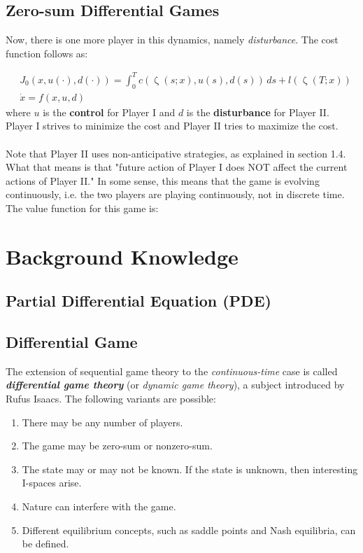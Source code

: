\documentclass{article}
\begin{document}
\subsection{Zero-sum Differential Games}
Now, there is one more player in this dynamics, namely \textit{disturbance}. The cost function follows as:

\begin{equation}
    \begin{aligned}
        & J_0(x,u(\cdot), d(\cdot)) =  \int_{0}^{T} c(\upzeta (s;x), u(s), d(s)) \, ds + l(\upzeta(T; x)) \\
        & \dot{x} = f(x,u,d)
    \end{aligned}
\end{equation}
where $u$ is the \textbf{control} for Player I and $d$ is the \textbf{disturbance} for Player II. Player I strives to minimize the cost and Player II tries to maximize the cost. 
\\
\\
\quad Note that Player II uses non-anticipative strategies, as explained in section 1.4. What that means is that "future action of Player I does NOT affect the current actions of Player II." In some sense, this means that the game is evolving continuously, i.e. the two players are playing continuously, not in discrete time. 
\\
The value function for this game is:


\newpage

\section{Background Knowledge}

\subsection{Partial Differential Equation (PDE)}

\subsection{Differential Game}
The extension of sequential game theory to the \textit{continuous-time} case is called \textbf{\textit{differential game theory}} (or \textit{dynamic game theory}), a subject introduced by Rufus Isaacs. The following variants are possible:
\begin{enumerate}
    \item There may be any number of players.
    \item The game may be zero-sum or nonzero-sum.
    \item The state may or may not be known. If the state is unknown, then interesting I-spaces arise.
    \item Nature can interfere with the game.
    \item Different equilibrium concepts, such as saddle points and Nash equilibria, can be defined. 
\end{enumerate}
\end{document}
